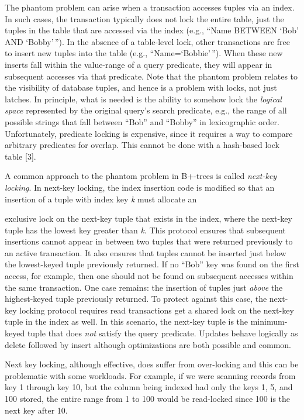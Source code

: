\documentclass[a4paper,11pt,twoside,openright]{book}
\begin{document}
The phantom problem can arise when a transaction accesses tuples via an
index. In such cases, the transaction typically does not lock the entire
table, just the tuples in the table that are accessed via the index
(e.g., ``Name BETWEEN `Bob' AND `Bobby'\,''). In the absence of a
table-level lock, other transactions are free to insert new tuples into
the table (e.g., ``Name=`Bobbie'\,''). When these new inserts fall
within the value-range of a query predicate, they will appear in
subsequent accesses via that predicate. Note that the phantom problem
relates to the visibility of database tuples, and hence is a problem
with locks, not just latches. In principle, what is needed is the
ability to somehow lock the \emph{logical space} represented by the
original query's search predicate, e.g., the range of all possible
strings that fall between ``Bob'' and ``Bobby'' in lexicographic order.
Unfortunately, predicate locking is expensive, since it requires a way
to compare arbitrary predicates for overlap. This cannot be done with a
hash-based lock table {[}3{]}.

A common approach to the phantom problem in B+-trees is called
\emph{next-key locking}. In next-key locking, the index insertion code
is modified so that an insertion of a tuple with index key \emph{k} must
allocate an

exclusive lock on the next-key tuple that exists in the index, where the
next-key tuple has the lowest key greater than \emph{k}. This protocol
ensures that subsequent insertions cannot appear in between two tuples
that were returned previously to an active transaction. It also ensures
that tuples cannot be inserted just below the lowest-keyed tuple
previously returned. If no ``Bob'' key was found on the first access,
for example, then one should not be found on subsequent accesses within
the same transaction. One case remains: the insertion of tuples just
\emph{above} the highest-keyed tuple previously returned. To protect
against this case, the next-key locking protocol requires read
transactions get a shared lock on the next-key tuple in the index as
well. In this scenario, the next-key tuple is the minimum-keyed tuple
that does \emph{not} satisfy the query predicate. Updates behave
logically as delete followed by insert although optimizations are both
possible and common.

Next key locking, although effective, does suffer from over-locking and
this can be problematic with some workloads. For example, if we were
scanning records from key 1 through key 10, but the column being indexed
had only the keys 1, 5, and 100 stored, the entire range from 1 to 100
would be read-locked since 100 is the next key after 10.
\end{document}
